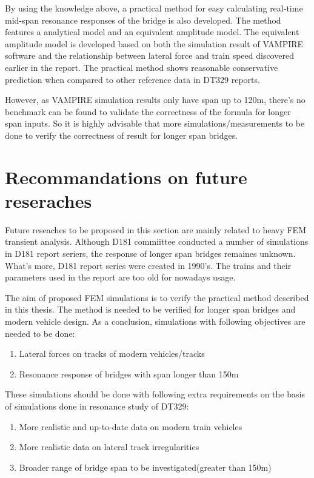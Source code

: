By using the knowledge above, a practical method for easy calculating real-time mid-span resonance responses of the bridge is also developed. The method features a analytical model and an equivalent amplitude model. The equivalent amplitude model is developed based on both the simulation result of VAMPIRE software and the relationship between lateral force and train speed discovered earlier in the report. The practical method shows reasonable conservative prediction when compared to other reference data in DT329 reports.

However, as VAMPIRE simulation results only have span up to 120m, there’s no benchmark can be found to validate the correctness of the formula for longer span inputs. So it is highly advisable that more simulations/measurements to be done to verify the correctness of result for longer span bridges.

\chapter{Recommandations on future reseraches}

Future reseaches to be proposed in this section are mainly related to heavy FEM transient analysis. Although D181 commiittee conducted a number of simulations in D181 report seriers, the response of longer span bridges remaines unknown. What's more, D181 report series were created in 1990's. The trains and their parameters used in the report are too old for nowadays usage.

The aim of proposed FEM simulations is to verify the practical method described in this thesis. The method is needed to be verified for longer span bridges and modern vehicle design. As a conclusion, simulations with following objectives are needed to be done:

\begin{enumerate}
    \item Lateral forces on tracks of modern vehicles/tracks
    \item Resonance response of bridges with span longer than 150m
\end{enumerate}

These simulations should be done with following extra requirements on the basis of simulations done in resonance study of DT329:

\begin{enumerate}
    \item More realistic and up-to-date data on modern train vehicles
    \item More realistic data on lateral track irregularities
    \item Broader range of bridge span to be investigated(greater than 150m)
\end{enumerate}

